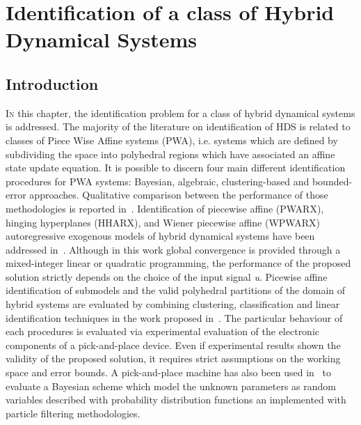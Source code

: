
\chapter{Identification of a class of Hybrid Dynamical Systems}

\label{chap:identification}
\minitoc

\thispagestyle{empty}

\newpage
\section{Introduction}
\lettrine[lines=4]{\color{brickred}I}{n} this chapter, the identification problem for a class of hybrid dynamical systems is addressed.
The majority of the literature on identification of HDS is related to classes of Piece Wise Affine systems (PWA), i.e. systems which are defined by subdividing the  space into polyhedral regions which have associated an affine state update equation.
It is possible to discern four main different identification procedures for PWA systems: Bayesian, algebraic, clustering-based and bounded-error approaches. Qualitative comparison between the performance of those methodologies is reported in~\citep{Juloski,Paoletti}.
Identification of piecewise affine (PWARX), hinging hyperplanes (HHARX), and Wiener piecewise affine (WPWARX) autoregressive exogenous models of hybrid dynamical systems have been addressed in~\citep{Bemporad}. Although in this work global convergence is provided through a mixed-integer linear or quadratic programming, the performance of the proposed solution strictly depends on the choice of the input signal \textit{u}. 
Picewise affine identification of submodels and the valid polyhedral partitions of the domain of hybrid systems are evaluated by combining clustering, classification and linear identification techniques in the work proposed in~\citep{Ferrari}. 
The particular behaviour of each procedures is evaluated via experimental evaluation of the electronic components of a pick-and-place device. Even if experimental results shown the validity of the proposed solution, it requires strict assumptions on the working space and error bounds.
A pick-and-place machine has also been used in~\citep{juloski2005bayesian} to evaluate a Bayesian scheme which model the unknown parameters as random variables described with probability distribution functions an implemented with particle filtering methodologies.
%

